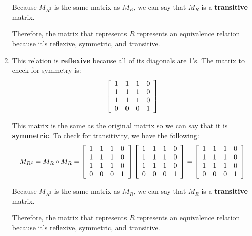 \documentclass[letterpaper, 12pt]{article}
\begin{document}
\begin{enumerate}
    Because $M_{R^2}$ is the same matrix as $M_R$, we can say that $M_R$ is a \textbf{transitive} matrix.
    
    Therefore, the matrix that represents $R$ represents an equivalence relation because it's reflexive, symmetric, and transitive.
    
    \item This relation is \textbf{reflexive} because all of its diagonals are 1's. The matrix to check for symmetry is:
    \[
    \left[
    \begin{array}{c c c c}
         1 & 1 & 1 & 0 \\
         1 & 1 & 1 & 0 \\
         1 & 1 & 1 & 0 \\
         0 & 0 & 0 & 1
    \end{array}
    \right]
    \]
    
    This matrix is the same as the original matrix so we can say that it is \textbf{symmetric}. To check for transitivity, we have the following:
    \[
    M_{R^2} = M_R \circ M_R = 
    \left[
    \begin{array}{c c c c}
         1 & 1 & 1 & 0 \\
         1 & 1 & 1 & 0 \\
         1 & 1 & 1 & 0 \\
         0 & 0 & 0 & 1
    \end{array}
    \right]
    \left[
    \begin{array}{c c c c}
         1 & 1 & 1 & 0 \\
         1 & 1 & 1 & 0 \\
         1 & 1 & 1 & 0 \\
         0 & 0 & 0 & 1
    \end{array}
    \right]
    =
    \left[
    \begin{array}{c c c c}
         1 & 1 & 1 & 0 \\
         1 & 1 & 1 & 0 \\
         1 & 1 & 1 & 0 \\
         0 & 0 & 0 & 1
    \end{array}
    \right]
    \]
    
    Because $M_{R^2}$ is the same matrix as $M_R$, we can say that $M_R$ is a \textbf{transitive} matrix.
    
    Therefore, the matrix that represents $R$ represents an equivalence relation because it's reflexive, symmetric, and transitive.
\end{enumerate}
\end{document}
